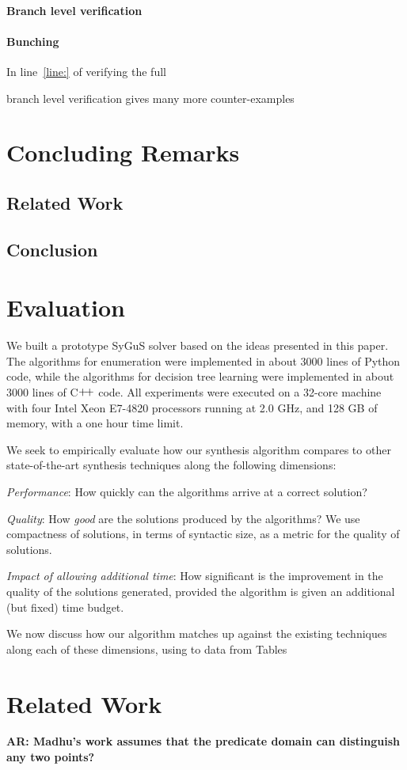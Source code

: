 \documentclass{llncs}
\newcommand\arsays[1]{{\bf AR: #1}}
\newcommand{\sygus}{{\sffamily\fontsize{8.5}{10}\selectfont SyGuS}\xspace}
\begin{document}
\paragraph{Branch level verification}

\paragraph{Bunching}
In line~\ref{line:} of verifying the full

branch level verification gives many more counter-examples

\section{Concluding Remarks}
\label{sec:conclusion}

\subsection{Related Work}

\subsection{Conclusion}

\section{Evaluation}
\label{sec:evaluation}
% 


We built a prototype \sygus solver based on the ideas presented in
this paper. The algorithms for enumeration were implemented in
about 3000 lines of Python code, while the algorithms for decision
tree learning were implemented in about 3000 lines of
C$\raisebox{1pt}{+\!+}$ code. All experiments were executed on a
32-core machine with four Intel Xeon E7-4820 processors running at 2.0
GHz, and 128 GB of memory, with a one hour time limit.

We seek to empirically evaluate how our synthesis algorithm compares
to other state-of-the-art synthesis techniques along the following
dimensions:
\begin{inparaenum}[(a)]
\item
\emph{Performance}: How quickly can the algorithms arrive at a correct
solution?
\item
\emph{Quality}: How \emph{good} are the solutions produced by the
algorithms? We use compactness of solutions, in terms of syntactic
size, as a metric for the quality of solutions.
\item
\emph{Impact of allowing additional time}: How significant is the
improvement in the quality of the solutions generated, provided the
algorithm is given an additional (but fixed) time budget.
\end{inparaenum}
We now discuss how our algorithm matches up against the existing
techniques along each of these dimensions, using to data from Tables


\section{Related Work}
\label{sec:related_work}


\setlength{\bibsep}{1pt}
\begin{small}

\end{small}

\arsays{Madhu's work assumes that the predicate domain can distinguish
any two points?}
\end{document}
